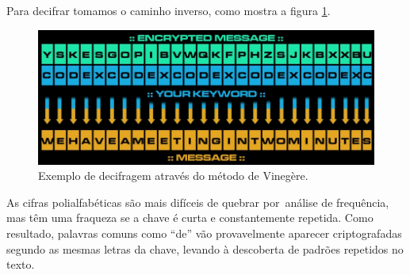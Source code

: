 \documentclass[
article,			%
11pt,				%
oneside,			%
a4paper,			%
english,			%
brazil,				%
sumario=tradicional
]{abntex2}
\begin{document}
		Para decifrar tomamos o caminho inverso, como mostra a figura \ref{fig:vinegere3}.
		
		\begin{figure} [h!]
			\centering
			\includegraphics[width=0.7\linewidth]{Imagens/vinegere3.png}
			\caption{Exemplo de decifragem através do método de Vinegère.}
			\label{fig:vinegere3}
		\end{figure}
		
		As cifras polialfabéticas são mais difíceis de quebrar por análise de frequência, mas têm uma fraqueza se a chave é curta e constantemente repetida. Como resultado, palavras comuns como ``de'' vão provavelmente aparecer criptografadas segundo as mesmas letras da chave, levando à descoberta de padrões repetidos no texto.
\end{document}
